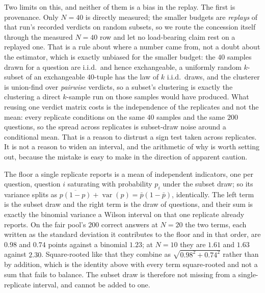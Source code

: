 Two limits on this, and neither of them is a bias in the replay. The first is provenance.
Only $N{=}40$ is directly measured; the smaller budgets are \emph{replays} of that run's
recorded verdicts on random subsets, so we route the concession itself through the measured
$N{=}40$ row and let no load-bearing claim rest on a replayed one. That is a rule about where
a number came from, not a doubt about the estimator, which is exactly unbiased for the
smaller budget: the $40$ samples drawn for a question are i.i.d.\ and hence exchangeable, a
uniformly random $k$-subset of an exchangeable $40$-tuple has the law of $k$ i.i.d.\ draws,
and the clusterer is union-find over \emph{pairwise} verdicts, so a subset's clustering is
exactly the clustering a direct $k$-sample run on those samples would have produced. What
reusing one verdict matrix costs is the independence of the replicates and not the mean:
every replicate conditions on the same $40$ samples and the same $200$ questions, so the
spread across replicates is subset-draw noise around a conditional mean. That is a reason to
distrust a sign test taken across replicates. It is not a reason to widen an interval, and
the arithmetic of why is worth setting out, because the mistake is easy to make in the
direction of apparent caution.

The floor a single replicate reports is a mean of independent indicators, one per question,
question $i$ saturating with probability $p_i$ under the subset draw; so its variance splits
as $\overline{p(1-p)} + \operatorname{var}(p) = \bar p(1-\bar p)$, identically. The left term is
the subset draw and the right term is the draw of questions, and their sum is exactly the
binomial variance a Wilson interval on that one replicate already reports. On the fair pool's
$200$ correct answers at $N{=}20$ the two terms, each written as the standard deviation it
contributes to the floor and in that order, are $0.98$ and $0.74$
points against a binomial $1.23$; at $N{=}10$ they are $1.61$ and $1.63$ against $2.30$.
Square-rooted like that they combine as $\sqrt{0.98^{2}+0.74^{2}}$ rather than by addition,
which is the identity above with every term square-rooted and not a sum that fails to
balance. The subset draw is
therefore not missing from a single-replicate interval, and cannot be added to one.

